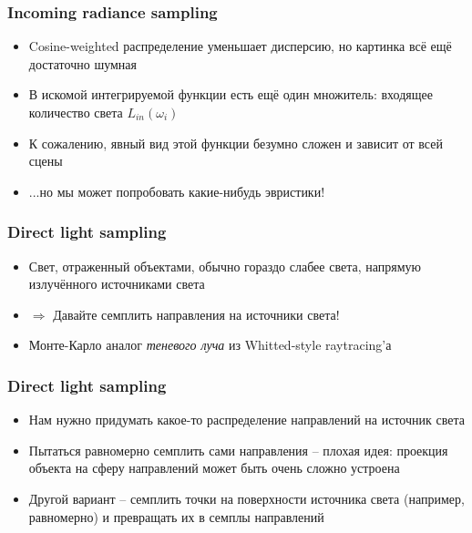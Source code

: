 \documentclass[10pt]{beamer}
\begin{document}
\begin{frame}
\frametitle{Incoming radiance sampling}
\begin{itemize}
\item Cosine-weighted распределение уменьшает дисперсию, но картинка всё ещё достаточно шумная
\pause
\item В искомой интегрируемой функции есть ещё один множитель: входящее количество света \begin{math}L_{in}(\omega_i)\end{math}
\pause
\item К сожалению, явный вид этой функции безумно сложен и зависит от всей сцены
\pause
\item ...но мы может попробовать какие-нибудь эвристики!
\end{itemize}
\end{frame}

\begin{frame}
\frametitle{Direct light sampling}
\begin{itemize}
\item Свет, отраженный объектами, обычно гораздо слабее света, напрямую излучённого источниками света
\pause
\item \begin{math}\Longrightarrow\end{math} Давайте семплить направления на источники света!
\pause
\item Монте-Карло аналог \textit{теневого луча} из Whitted-style raytracing'а
\end{itemize}
\end{frame}

\begin{frame}
\frametitle{Direct light sampling}
\begin{itemize}
\item Нам нужно придумать какое-то распределение направлений на источник света
\pause
\item Пытаться равномерно семплить сами направления -- плохая идея: проекция объекта на сферу направлений может быть очень сложно устроена
\pause
\item Другой вариант -- семплить точки на поверхности источника света (например, равномерно) и превращать их в семплы направлений
\end{itemize}
\end{frame}
\end{document}
